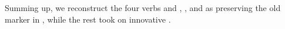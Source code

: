 


%




Summing up, we reconstruct the four verbs  and  ,  , and   as preserving the old  marker  in \PWai, while the rest took on innovative .

